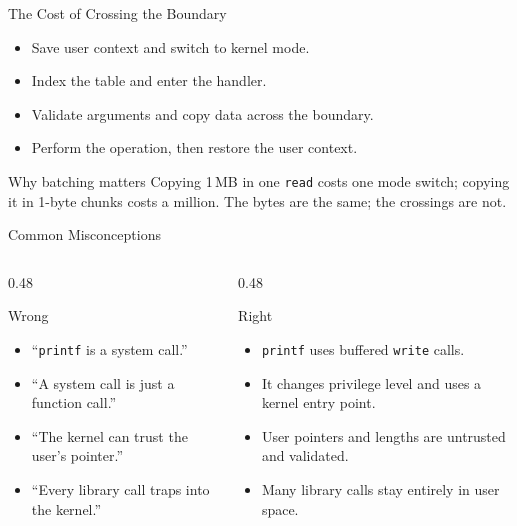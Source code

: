 \documentclass[aspectratio=169]{beamer}
\begin{document}
\begin{frame}{The Cost of Crossing the Boundary}
  \begin{itemize}
    \item Save user context and switch to kernel mode.
    \item Index the table and enter the handler.
    \item Validate arguments and copy data across the boundary.
    \item Perform the operation, then restore the user context.
  \end{itemize}
  \vspace{0.2cm}
  \begin{exampleblock}{Why batching matters}
    Copying 1\,MB in one \texttt{read} costs one mode switch; copying it in
    1-byte chunks costs a million. The bytes are the same; the crossings are
    not.
  \end{exampleblock}
\end{frame}

\begin{frame}{Common Misconceptions}
  \begin{columns}[T]
    \begin{column}{0.48\textwidth}
      \begin{block}{Wrong}
        \begin{itemize}
          \item ``\texttt{printf} is a system call.''
          \item ``A system call is just a function call.''
          \item ``The kernel can trust the user's pointer.''
          \item ``Every library call traps into the kernel.''
        \end{itemize}
      \end{block}
    \end{column}
    \begin{column}{0.48\textwidth}
      \begin{block}{Right}
        \begin{itemize}
          \item \texttt{printf} uses buffered \texttt{write} calls.
          \item It changes privilege level and uses a kernel entry point.
          \item User pointers and lengths are untrusted and validated.
          \item Many library calls stay entirely in user space.
        \end{itemize}
      \end{block}
    \end{column}
  \end{columns}
\end{frame}
\end{document}
